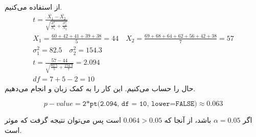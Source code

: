 از
استفاده می‌کنیم.
\begin{gather*}
    t = \frac{\bar{X_1} - \bar{X_2}}{\sqrt{\frac{\sigma^2_1}{N_1}+\frac{\sigma^2_2}{N_2}}}\\
    X_1 = \frac{60 + 42 + 41 + 39 + 38}{5} = 44 \quad X_2 = \frac{69 + 68 + 64 + 62 + 56 + 42 + 38}{7} = 57\\
    \sigma_1^2 = 82.5 \quad \sigma_2^2 = 154.3\\
    t = \frac{57 - 44}{\sqrt{\frac{82.5}{5} +\frac{154.3}{7}}} = 2.094\\
    df = 7 + 5 - 2 = 10
\end{gather*}
حال
را حساب می‌کنیم. این کار را به کمک زبان
و
انجام می‌دهیم.
\begin{latin}
    \[ %
        p-value = \texttt{2*pt(2.094, df = 10, lower=FALSE)} \approx 0.063
    \]
\end{latin}
اگر
$\alpha = 0.05$
باشد، از آنجا که
$0.064 > 0.05$
است پس می‌توان نتیجه گرفت که موثر است.



